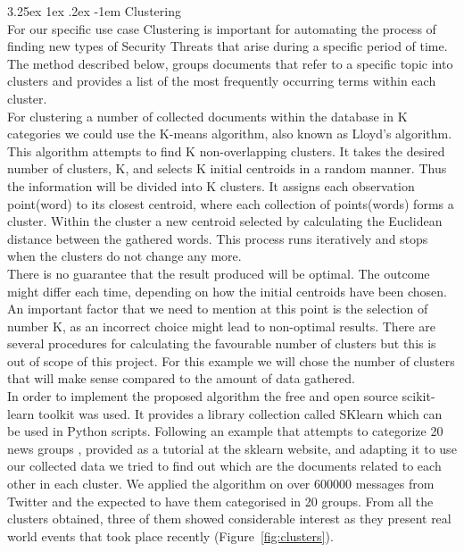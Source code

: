 \documentclass[12pt]{article}
\makeatletter
\renewcommand\paragraph{\@startsection{paragraph}{5}{\z@}%
  {3.25ex \@plus1ex \@minus.2ex}%
  {-1em}%
  {\normalfont\normalsize\bfseries}}
\makeatother
\begin{document}
\paragraph{Clustering}
\hfill \break 
\\
For our specific use case Clustering is important for automating the process of finding new types of Security Threats that arise during a specific period of time. 
\hfill \break 
\\
The method described below, groups documents that refer to a specific topic into clusters and provides a list of the most frequently occurring terms within each cluster.
\hfill \break 
\\
For clustering a number of collected documents within the database in K categories we could use the K-means\cite{k-means} algorithm, also known as Lloyd's algorithm. This algorithm \cite{k-means-example} attempts to find K non-overlapping clusters. It takes the desired number of clusters, K, and selects K initial centroids in a  random manner. Thus the information will be divided into K clusters. It assigns each observation point(word) to its closest centroid, where each collection of points(words) forms a cluster. Within the cluster a new centroid selected by calculating the Euclidean distance between the gathered words. This process runs iteratively and stops when the clusters do not change any more.
\hfill \break 
\\ 
There is no guarantee that the result produced will be optimal. The outcome might differ each time, depending on how the initial centroids have been chosen. An important factor that we need to mention at this point is the selection of number K, as an incorrect choice might lead to non-optimal results. There are several procedures\cite{procedures-for-kmeans} for calculating the favourable number of clusters but this is out of scope of this project. For this example we will chose the number of clusters that will make sense compared to the amount of data gathered.
\hfill \break 
\\
In order to implement the proposed algorithm the free and open source scikit-learn \cite{sklearn} toolkit was used. It provides a library collection called SKlearn which can be used in Python scripts. Following an example that attempts to categorize 20 news groups \cite{k-means-20news}, provided as a tutorial at the sklearn website, and adapting it to use our collected data we tried to find out which are the documents related to each other in each cluster. We applied the algorithm on over 600000 messages from Twitter and the expected to have them categorised in 20 groups. From all the clusters obtained, three of them showed considerable interest as they present real world events that took place recently (Figure~\ref{fig:clusters}). 
\end{document}
